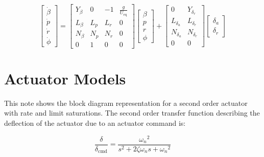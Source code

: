 \begin{equation*}
  \left[
    \begin{array}{c}
      \dot{\beta} \\[4pt]
      \dot{p} \\[4pt]
      \dot{r} \\[4pt]
      \dot{\phi}
    \end{array}
  \right]
  =
  \left[
    \begin{array}{cccc}
      Y_{\beta} & 0 & -1 & \frac{g}{U_{\text{eq}}} \\[4pt]
      L_{\beta} & L_{p} & L_{r} & 0 \\[4pt]
      N_{\beta} & N_{p} & N_{r} & 0 \\[4pt]
      0 & 1 & 0 & 0
    \end{array}
  \right]
  \left[
    \begin{array}{c}
      \beta \\[4pt]
      p \\[4pt]
      r \\[4pt]
      \phi
    \end{array}
  \right]
  +
  \left[
    \begin{array}{cc}
      0 & Y_{\delta_{r}} \\[4pt]
      L_{\delta_{a}} & L_{\delta_{r}} \\[4pt]
      N_{\delta_{a}} & N_{\delta_{r}} \\[4pt]
      0 & 0
    \end{array}
  \right]
  \left[
    \begin{array}{c}
      \delta_{a} \\[4pt]
      \delta_{r}
    \end{array}
  \right]
\end{equation*}

\section{Actuator Models}

This note shows the block diagram representation for a second order actuator with rate and limit saturations.
The second order transfer function describing the deflection of the actuator due to an actuator command is:

\begin{equation*}
  \frac{\delta}{\delta_{\text{cmd}}}=\frac{{\omega_{n}}^{2}}{s^{2}+2\zeta\omega_{n}s+{\omega_{n}}^{2}}
\end{equation*}

